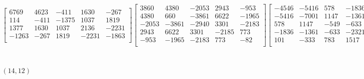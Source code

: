 \documentclass[12pt]{amsart}
\theoremstyle{plain}
\theoremstyle{definition}
\begin{document}
\begin{landscape}
\begin{align*}
\begin{bmatrix}
 6769  &   4623  &   -411  &   1630  &   -267  \\ 
 114  &   -411  &   -1375  &   1037  &   1819  \\ 
 1377  &   1630  &   1037  &   2136  &   -2231  \\ 
 -1263  &   -267  &   1819  &   -2231  &   -1863  \\ 
\end{bmatrix}
\begin{bmatrix}
3860  &   4380  &   -2053  &   2943  &   -953  \\ 
 4380  &   660  &   -3861  &   6622  &   -1965  \\ 
 -2053  &   -3861  &   -2940  &   3301  &   -2183  \\ 
 2943  &   6622  &   3301  &   -2185  &   773  \\ 
 -953  &   -1965  &   -2183  &   773  &   -82  \\ 
\end{bmatrix}
\begin{bmatrix}
-4546  &   -5416  &   578  &   -1836  &   101  \\ 
 -5416  &   -7001  &   1147  &   -1361  &   -333  \\ 
 578  &   1147  &   -549  &   -633  &   783  \\ 
 -1836  &   -1361  &   -633  &   -2321  &   1517  \\ 
 101  &   -333  &   783  &   1517  &   -2258  \\ 
\end{bmatrix}
\\
(14,12) &:
\begin{bmatrix}
-3166  &   469  &   1384  &   -1046  &   1578  \\ 
 469  &   2570  &   -1108  &   459  &   322  \\ 
 1384  &   -1108  &   294  &   203  &   -3171  \\ 
 -1046  &   459  &   203  &   -1249  &   3950  \\ 
 1578  &   322  &   -3171  &   3950  &   -639  \\ 
\end{bmatrix}
\begin{bmatrix}
-3659  &   2080  &   -1637  &   2049  &   -2356  \\ 
 2080  &   554  &   401  &   -1499  &   3168  \\ 
 -1637  &   401  &   633  &   167  &   -1911  \\ 
 2049  &   -1499  &   167  &   -1181  &   1176  \\ 
 -2356  &   3168  &   -1911  &   1176  &   -163  \\ 

\end{bmatrix}
\end{align*}
\end{landscape}
\end{document}
